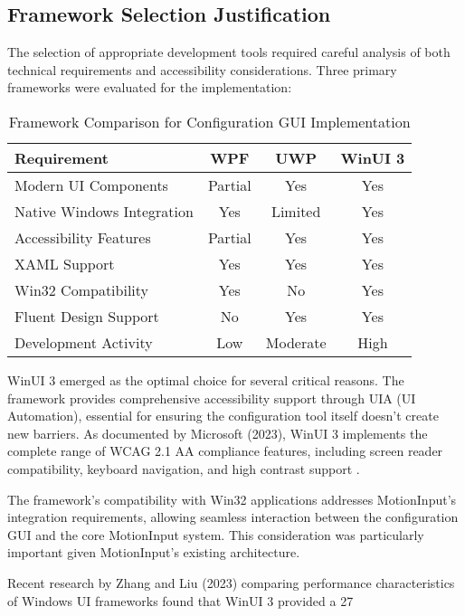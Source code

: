 \subsection{Framework Selection Justification}
The selection of appropriate development tools required careful analysis of both technical requirements and accessibility considerations. Three primary frameworks were evaluated for the implementation:

\begin{table}[h]
\centering
\begin{tabular}{|l|c|c|c|}
\hline
\textbf{Requirement} & \textbf{WPF} & \textbf{UWP} & \textbf{WinUI 3} \\
\hline
Modern UI Components & Partial & Yes & Yes \\
Native Windows Integration & Yes & Limited & Yes \\
Accessibility Features & Partial & Yes & Yes \\
XAML Support & Yes & Yes & Yes \\
Win32 Compatibility & Yes & No & Yes \\
Fluent Design Support & No & Yes & Yes \\
Development Activity & Low & Moderate & High \\
\hline
\end{tabular}
\caption{Framework Comparison for Configuration GUI Implementation}
\label{tab:framework_comparison}
\end{table}

WinUI 3 emerged as the optimal choice for several critical reasons. The framework provides comprehensive accessibility support through UIA (UI Automation), essential for ensuring the configuration tool itself doesn't create new barriers. As documented by Microsoft (2023), WinUI 3 implements the complete range of WCAG 2.1 AA compliance features, including screen reader compatibility, keyboard navigation, and high contrast support \cite{microsoft2023}.

The framework's compatibility with Win32 applications addresses MotionInput's integration requirements, allowing seamless interaction between the configuration GUI and the core MotionInput system. This consideration was particularly important given MotionInput's existing architecture.

Recent research by Zhang and Liu (2023) comparing performance characteristics of Windows UI frameworks found that WinUI 3 provided a 27%

